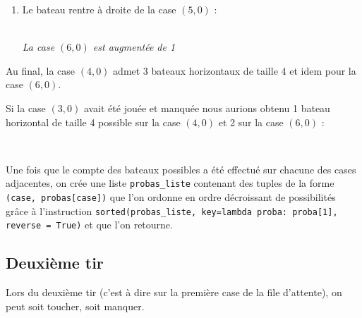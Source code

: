 \begin{enumerate}
\item Le bateau rentre à droite de la case $(5,0)$ :

\begin{center}
\\
\textit{La case $(6,0)$ est augmentée de 1
}\end{center}
\end{enumerate} 
Au final, la case $(4,0)$ admet 3 bateaux horizontaux de taille 4 et idem pour la case $(6,0)$.

Si la case $(3,0)$ avait été jouée et manquée nous aurions obtenu 1 bateau horizontal de taille 4 possible sur la case $(4,0)$ et 2 sur la case $(6,0)$ :

\begin{center}
\\
\end{center}

Une fois que le compte des bateaux possibles a été effectué sur chacune des cases adjacentes, on crée une liste \texttt{probas\_liste} contenant des tuples de la forme \texttt{(case, probas[case])} que l'on ordonne en ordre décroissant de possibilités grâce à l'instruction \texttt{sorted(probas\_liste, key=lambda proba: proba[1], reverse = True)} et que l'on retourne.

\subsection{Deuxième tir}
Lors du deuxième tir (c'est à dire sur la première case de la file d'attente), on peut soit toucher, soit manquer.
